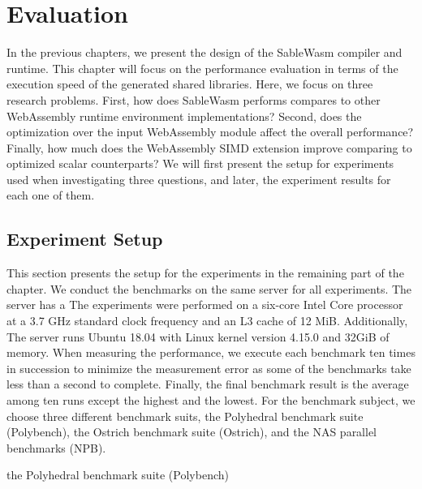 \chapter{Evaluation}

In the previous chapters, we present the design of the SableWasm compiler and runtime. This chapter will focus on the performance evaluation in terms of the execution speed of the generated shared libraries. Here, we focus on three research problems. First, how does SableWasm performs compares to other WebAssembly runtime environment implementations? Second, does the optimization over the input WebAssembly module affect the overall performance? Finally, how much does the WebAssembly SIMD extension improve comparing to optimized scalar counterparts? We will first present the setup for experiments used when investigating three questions, and later, the experiment results for each one of them.

\section{Experiment Setup}

This section presents the setup for the experiments in the remaining part of the chapter. We conduct the benchmarks on the same server for all experiments. The server has a The experiments were performed on a six-core Intel Core processor at a 3.7 GHz standard clock frequency and an L3 cache of 12 MiB. Additionally, The server runs Ubuntu 18.04 with Linux kernel version 4.15.0 and 32GiB of memory. When measuring the performance, we execute each benchmark ten times in succession to minimize the measurement error as some of the benchmarks take less than a second to complete. Finally, the final benchmark result is the average among ten runs except the highest and the lowest. For the benchmark subject, we choose three different benchmark suits, the Polyhedral benchmark suite (Polybench), the Ostrich benchmark suite (Ostrich), and the NAS parallel benchmarks (NPB).

\begin{table}
    \centering
    
    \caption{the Polyhedral benchmark suite (Polybench)}
    \label{tbl:polybench}
\end{table}

